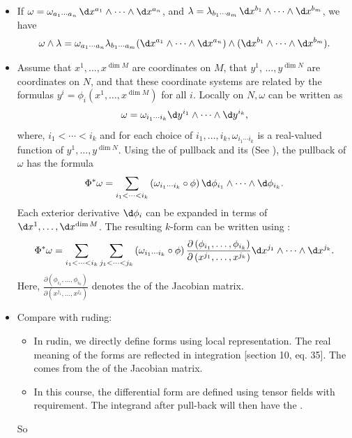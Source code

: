 \documentclass{article}
\begin{document}
\begin{enumerate}
\begin{itemize}
\item {} If  $\omega=\omega_{a_1\cdots a_n} \, \d x^{a_1} \wedge \cdots \wedge \d x^{a_n}$, and $\lambda=\lambda_{b_1\cdots a_m} \, \d x^{b_1} \wedge \cdots \wedge \d x^{b_m}$, we have
$$\omega \wedge \lambda=\omega_{a_1\cdots a_n} \lambda_{b_1\cdots a_m} (\d x^{a_1} \wedge \cdots \wedge \d x^{a_n})\wedge (\d x^{b_1} \wedge \cdots \wedge \d x^{b_m}).$$
\item {} {\tiny Assume that $x^1, \ldots, x^{\dim M}$ are coordinates on $M$, that $y^1$, $\ldots, y^{\dim N}$ are coordinates on $N$, and that these coordinate systems are related by the formulas $y^i=\phi_i\left(x^1, \ldots, x^{\dim M}\right)$ for all $i$. Locally on $N, \omega$ can be written as
\begin{align*}
\omega=\omega_{i_1 \cdots i_k} \d y^{i_1} \wedge \cdots \wedge \d y^{i_k},
\end{align*}
where, $i_1<\cdots<i_k$ and  for each choice of $i_1, \ldots, i_k, \omega_{i_1 \cdots i_k}$ is a real-valued function of $y^1, \ldots, y^{\dim N}$.} Using the  of pullback and its  (See ), the pullback of $\omega$ has the formula
\begin{align*}
\Phi^* \omega=\sum_{i_1<\cdots<i_k}\left(\omega_{i_1 \cdots i_k} \circ \phi\right) \d \phi_{i_1} \wedge \cdots \wedge \d \phi_{i_k} .
\end{align*}
Each exterior derivative $\d \phi_i$ can be expanded in terms of $\d x^1, \ldots, \d x^{\dim M}$. The resulting $k$-form can be written using :
\begin{align*}
\Phi^* \omega=\sum_{i_1<\cdots<i_k} \sum_{j_1<\cdots<j_k}\left(\omega_{i_1 \cdots i_k} \circ \phi\right) \frac{\partial\left(\phi_{i_1}, \ldots, \phi_{i_k}\right)}{\partial\left(x^{j_1}, \ldots, x^{j_k}\right)} \d x^{j_1} \wedge \cdots \wedge \d x^{j_k} .
\end{align*}
Here, $\frac{\partial\left(\phi_{i_1}, \ldots, \phi_{i_k}\right)}{\partial\left(x^{j_1}, \ldots, x^{j_k}\right)}$ denotes the  of the Jacobian matrix.
\item Compare with ruding: 
\begin{itemize}[$\ast$]
    \item In rudin, we directly define forms using local representation. The real meaning of the forms are reflected in integration \cite{rudin1976principles}[section 10, eq. 35]. The  comes from the  of the Jacobian matrix.
    \item In this course, the differential form are defined using tensor fields with   requirement. The integrand after pull-back will then have the  .
\end{itemize}
So 
\end{itemize}
    

\end{enumerate}
\end{document}

